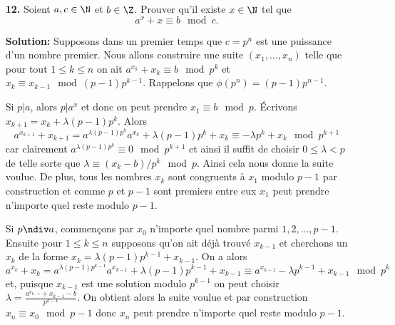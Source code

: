 \documentclass[language=german,style=solution]{smo}
\begin{document}
\begin{enumerate}
\item[\textbf{12.}] %
Soient $a, c\in  \N$ et $b\in \Z$. Prouver qu'il existe $x\in \N$ tel que
\[
a^x+x\equiv b \mod c.
\]

\textbf{Solution:} Supposons dans un premier temps que $c = p^n$ est une puissance d'un nombre premier. Nous allons construire une suite $(x_1, \ldots, x_n)$ telle que pour tout $1\leq k\leq n$ on ait $a^{x_k} + x_k \equiv b \mod {p^k}$ et $x_k \equiv x_{k-1} \mod {(p-1)p^{k-1}}$. Rappelons que $\phi(p^n) = (p-1)p^{n-1}$.
		
Si $p|a$, alors $p|a^x$ et donc on peut prendre $x_1\equiv b\mod p$. Écrivons $x_{k+1} = x_k + \lambda (p-1)p^k$. Alors
\[
	a^{x_{k+1}}+x_{k+1} = a^{\lambda (p-1)p^k}a^{x_k} + \lambda (p-1)p^k + x_k \equiv -\lambda p^k + x_k \mod{p^{k+1}}
\]
car clairement $a^{\lambda (p-1)p^k} \equiv 0 \mod{p^{k+1}}$ et ainsi il suffit de choisir $0\leq \lambda < p$ de telle sorte que $\lambda \equiv (x_k-b)/p^k \mod{p}$. Ainsi cela nous donne la suite voulue. De plus, tous les nombres $x_k$ sont congruents à $x_1$ modulo $p-1$ par construction et comme $p$ et $p-1$ sont premiers entre eux $x_1$ peut prendre n'importe quel reste modulo $p-1$.

Si $p\ndiv a$, commençons par $x_0$ n'importe quel nombre parmi $1, 2, \ldots, p-1$. Ensuite pour $1\leq k \leq n$ supposons qu'on ait déjà trouvé $x_{k-1}$ et cherchons un $x_k$ de la forme $x_k = \lambda (p-1)p^{k-1} + x_{k-1}$. On a alors
\[
	a^{x_k} + x_k = a^{\lambda(p-1)p^{k-1}}a^{x_{k-1}} + \lambda(p-1)p^{k-1}+ x_{k-1}\equiv 
	a^{x_{k-1}} - \lambda p^{k-1} + x_{k-1} \mod{p^{k}}
\]
et, puisque $x_{k-1}$ est une solution modulo $p^{k-1}$ on peut choisir $\lambda = \frac{a^{x_{k-1}}+x_{k-1}-b}{p^{k-1}}$. On obtient alors la suite voulue et par construction $x_n \equiv x_0 \mod{p-1}$ donc $x_n$ peut prendre n'importe quel reste modulo $p-1$.


\end{enumerate}
\end{document}
